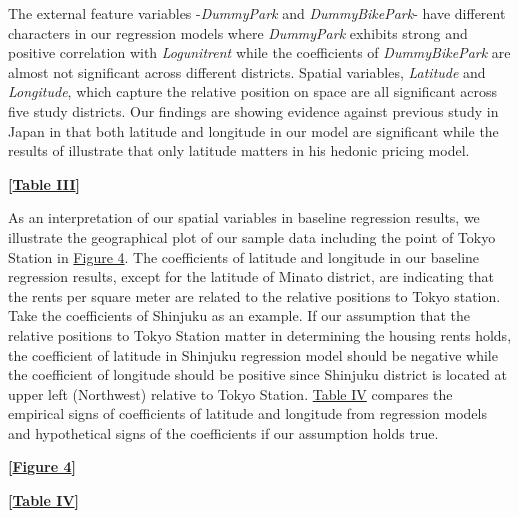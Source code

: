 \documentclass[a4paper, 12pt]{article} %
\newcommand{\var}[1][\textit]{#1}
\begin{document}
The external feature variables -\var{DummyPark} and \var{DummyBikePark}- have different characters in our regression models where \var{DummyPark} exhibits strong and positive correlation with \var{Logunitrent} while the coefficients of \var{DummyBikePark} are almost not significant across different districts. Spatial variables, \var{Latitude} and \var{Longitude}, which capture the relative position on space are all significant across five study districts. Our findings are showing evidence against previous study in Japan \citep{shimizu} in that both latitude and longitude in our model are significant while the results of \citet{shimizu} illustrate that only latitude matters in his hedonic pricing model. 

\bigskip
 \centerline{\bf [\hyperref[tb3]{Table III}]}
\bigskip

As an interpretation of our spatial variables in baseline regression results, we illustrate the geographical plot of our sample data including the point of Tokyo Station in \hyperref[fig4]{Figure 4}. The coefficients of latitude and longitude in our baseline regression results, except for the latitude of Minato district, are indicating that the rents per square meter are related to the relative positions to Tokyo station. Take the coefficients of Shinjuku as an example. If our assumption that the relative positions to Tokyo Station matter in determining the housing rents holds, the coefficient of latitude in Shinjuku regression model should be negative while the coefficient of longitude should be positive since Shinjuku district is located at upper left (Northwest) relative to Tokyo Station. \hyperref[tb4]{Table IV} compares the empirical signs of coefficients of latitude and longitude from regression models and hypothetical signs of the coefficients if our assumption holds true.

\bigskip
 \centerline{\bf [\hyperref[fig4]{Figure 4}]}
\bigskip

\bigskip
 \centerline{\bf [\hyperref[tb4]{Table IV}]}
\bigskip
\end{document}
